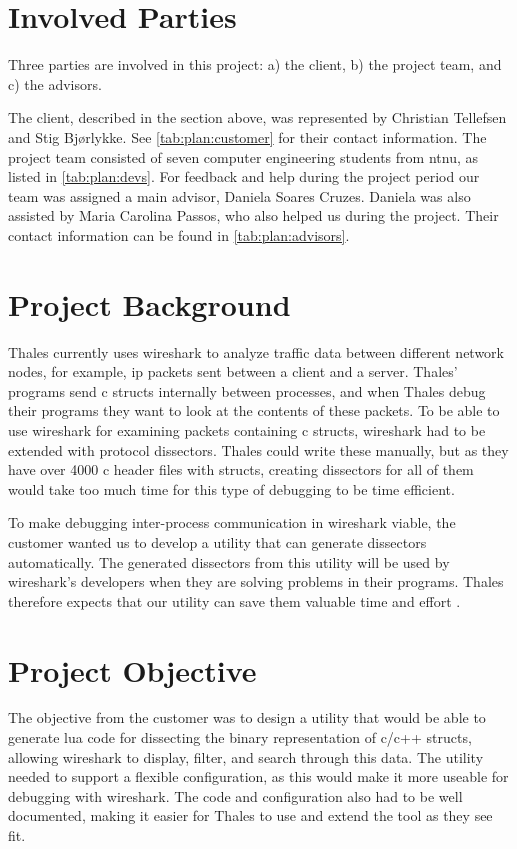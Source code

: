 \section{Involved Parties}
Three parties are involved in this project: a) the client, b) the project team, and c) the advisors.

The client, described in the section above, was represented by Christian Tellefsen and Stig Bjørlykke. See \autoref{tab:plan:customer} for their contact information.
The project team consisted of seven computer engineering students from \Gls{ntnu}, as listed in \autoref{tab:plan:devs}.
For feedback and help during the project period our team was assigned a main advisor, Daniela Soares Cruzes.
Daniela was also assisted by Maria Carolina Passos, who also helped us during the project. Their contact information can be found in \autoref{tab:plan:advisors}.
\section{Project Background}
Thales currently uses \Gls{wireshark} to analyze traffic data between different network nodes, for example, \Gls{ip} \glspl{packet} sent between a client and a server.
Thales' programs send \Gls{c} \glspl{struct} internally between processes, and when Thales debug their programs they want to look at the contents of these \glspl{packet}.
To be able to use \Gls{wireshark} for examining \glspl{packet} containing \Gls{c} \glspl{struct}, \Gls{wireshark} had to be extended with \gls{protocol} \glspl{dissector}.
Thales could write these manually, but as they have over 4000 \Gls{c} header files with structs, creating \glspl{dissector} for
all of them would take too much time for this type of debugging to be time efficient. 

To make debugging inter-process communication in \Gls{wireshark} viable, the customer wanted us to develop a \gls{utility} that can generate \glspl{dissector} automatically.
The generated \glspl{dissector} from this \gls{utility} will be used by \Gls{wireshark}'s developers when they are solving problems in their programs.
Thales therefore expects that our \gls{utility} can save them valuable time and effort .

\section{Project Objective}
The objective from the customer was to design a \gls{utility} that would be able to generate \Gls{lua} code for dissecting the \gls{binary} representation
of \Gls{c}/\Gls{c++} \glspl{struct}, allowing \Gls{wireshark} to display, filter, and search through this data.
The \gls{utility} needed to support a flexible configuration, as this would make it more useable for debugging with \Gls{wireshark}. 
The code and configuration also had to be well documented, making it easier for Thales to use and extend the tool as they see fit.

